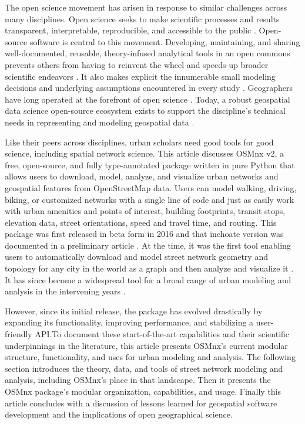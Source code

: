 \documentclass[12pt,letterpaper]{article} %
\begin{document}
The open science movement has arisen in response to similar challenges across many disciplines. Open science seeks to make scientific processes and results transparent, interpretable, reproducible, and accessible to the public \citep{kedron_reproducibility_2021}. Open-source software is central to this movement. Developing, maintaining, and sharing well-documented, reusable, theory-infused analytical tools in an open commons prevents others from having to reinvent the wheel and speeds-up broader scientific endeavors \citep{singleton_establishing_2016}. It also makes explicit the innumerable small modeling decisions and underlying assumptions encountered in every study \citep{gahegan_our_2018,rey_pysal_2022}. Geographers have long operated at the forefront of open science \citep{rey_show_2009,harris_more_2017}. Today, a robust geospatial data science open-source ecosystem exists to support the discipline's technical needs in representing and modeling geospatial data \citep{fleischmann_momepy_2019,rey_pysal:_2019,van_den_bossche_geopandasgeopandas_2024}.

Like their peers across disciplines, urban scholars need good tools for good science, including spatial network science. This article discusses OSMnx v2, a free, open-source, and fully type-annotated package written in pure Python that allows users to download, model, analyze, and visualize urban networks and geospatial features from OpenStreetMap data. Users can model walking, driving, biking, or customized networks with a single line of code and just as easily work with urban amenities and points of interest, building footprints, transit stops, elevation data, street orientations, speed and travel time, and routing. This package was first released in beta form in 2016 and that inchoate version was documented in a preliminary article \citep{boeing_osmnx:_2017}. At the time, it was the first tool enabling users to automatically download and model street network geometry and topology for any city in the world as a graph and then analyze and visualize it \citep{boeing_right_2020}. It has since become a widespread tool for a broad range of urban modeling and analysis in the intervening years \citep[e.g.,][]{coutrot_entropy_2022,dacci_signature_2019,feng_spatial_2020,gervasoni_calculating_2017,liao_disparities_2020,natera_orozco_data-driven_2020,yin_multi-task_2020,young_automatic_2020}.

However, since its initial release, the package has evolved drastically by expanding its functionality, improving performance, and stabilizing a user-friendly API.\@ To document these start-of-the-art capabilities and their scientific underpinnings in the literature, this article presents OSMnx's current modular structure, functionality, and uses for urban modeling and analysis. The following section introduces the theory, data, and tools of street network modeling and analysis, including OSMnx's place in that landscape. Then it presents the OSMnx package's modular organization, capabilities, and usage. Finally this article concludes with a discussion of lessons learned for geospatial software development and the implications of open geographical science.
\end{document}
